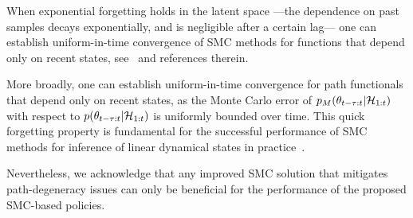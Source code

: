 When exponential forgetting holds in the latent space
---\ie the dependence on past samples decays exponentially, and is negligible after a certain lag---
one can establish uniform-in-time convergence of SMC methods for functions that depend only on recent states, see~\citep{j-Kantas2015} and references therein.

More broadly, one can establish uniform-in-time convergence for path functionals that depend only on recent states,
as the Monte Carlo error of $p_M(\theta_{t-\tau:t}|\mathcal{H}_{1:t})$ with respect to $p(\theta_{t-\tau:t}|\mathcal{H}_{1:t})$ is uniformly bounded over time.
This quick forgetting property is fundamental
for the successful performance of SMC methods for inference of linear dynamical states in practice~\citep{j-Urteaga2017b,j-Urteaga2016,j-Urteaga2016a}.

Nevertheless, we acknowledge that any improved SMC solution that mitigates path-degeneracy issues can only be beneficial for the performance of the proposed SMC-based policies.